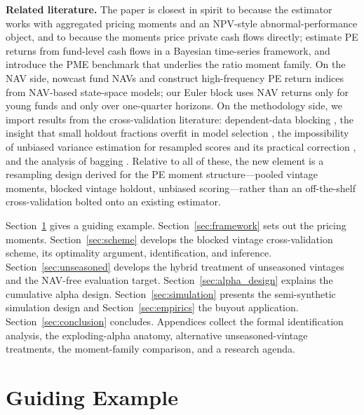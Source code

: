 \documentclass[11pt]{article}
\begin{document}
\textbf{Related literature.} The paper is closest in spirit to \citet{KortewegNagel2016} because the estimator works with aggregated pricing moments and an NPV-style abnormal-performance object, and to \citet{DriessenLinPhalippou2012} because the moments price private cash flows directly; \citet{AngChenGoetzmannPhalippou2018} estimate PE returns from fund-level cash flows in a Bayesian time-series framework, and \citet{KaplanSchoar2005} introduce the PME benchmark that underlies the ratio moment family. On the NAV side, \citet{brown2023nowcasting} nowcast fund NAVs and \citet{GhyselsGredilAndreou2025} construct high-frequency PE return indices from NAV-based state-space models; our Euler block uses NAV returns only for young funds and only over one-quarter horizons. On the methodology side, we import results from the cross-validation literature: dependent-data blocking \citep{Racine2000}, the insight that small holdout fractions overfit in model selection \citep{Shao1993,ArlotCelisse2010}, the impossibility of unbiased variance estimation for resampled scores \citep{BengioGrandvalet2004} and its practical correction \citep{NadeauBengio2003}, and the analysis of bagging \citep{BuhlmannYu2002}. Relative to all of these, the new element is a resampling design derived for the PE moment structure---pooled vintage moments, blocked vintage holdout, unbiased scoring---rather than an off-the-shelf cross-validation bolted onto an existing estimator.

Section~\ref{sec:example} gives a guiding example. Section~\ref{sec:framework} sets out the pricing moments. Section~\ref{sec:scheme} develops the blocked vintage cross-validation scheme, its optimality argument, identification, and inference. Section~\ref{sec:unseasoned} develops the hybrid treatment of unseasoned vintages and the NAV-free evaluation target. Section~\ref{sec:alpha_design} explains the cumulative alpha design. Section~\ref{sec:simulation} presents the semi-synthetic simulation design and Section~\ref{sec:empirics} the buyout application. Section~\ref{sec:conclusion} concludes. Appendices collect the formal identification analysis, the exploding-alpha anatomy, alternative unseasoned-vintage treatments, the moment-family comparison, and a research agenda.

\section{Guiding Example}
\label{sec:example}
\end{document}
